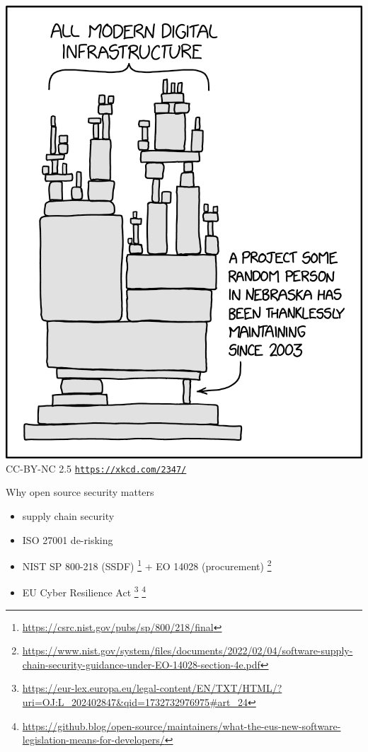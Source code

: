 \documentclass[ignorenonframetext,aspectratio=169,12pt]{beamer}
\makeatletter
\def\maxheight{\ifdim\Gin@nat@height>\textheight\textheight\else\Gin@nat@height\fi}
\makeatother
\begin{document}
\begin{frame}[plain]
\begin{center}
    \includegraphics[height=0.9\maxheight,keepaspectratio]{dependency_2x.png}
    \\
    \tiny
    CC-BY-NC 2.5 \texttt{\url{https://xkcd.com/2347/}}
\end{center}
\end{frame}

\begin{frame}{Why open source security matters}
    \begin{itemize}
        \item supply chain security
        \item ISO 27001 de-risking
        \item NIST SP 800-218 (SSDF)
            \footnote{\url{https://csrc.nist.gov/pubs/sp/800/218/final}}
            + EO 14028 (procurement)
            \footnote{\url{https://www.nist.gov/system/files/documents/2022/02/04/software-supply-chain-security-guidance-under-EO-14028-section-4e.pdf}}
        \item EU Cyber Resilience Act
            \footnote{\url{https://eur-lex.europa.eu/legal-content/EN/TXT/HTML/?uri=OJ:L_202402847&qid=1732732976975\#art_24}}
            \footnote{\url{https://github.blog/open-source/maintainers/what-the-eus-new-software-legislation-means-for-developers/}}
    \end{itemize}
\end{frame}
\end{document}
